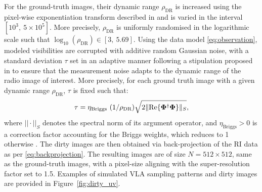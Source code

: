 \documentclass[preprint2,twocolumn]{aastex631}
\newcommand{\Phib}{\ensuremath{\boldsymbol{\Phi}}}
\begin{document}
For the ground-truth images, their dynamic range $\rho_{\textrm{DR}}$ is increased using the pixel-wise exponentiation transform described in \citet{terris2022} and is varied in the interval $[10^3,~ 5\times 10^5]$. More precisely, $\rho_{\textrm{DR}}$ is uniformly randomised in the logarithmic scale such that $\log_{10}(\rho_{\textrm{DR}})\in [3,~5.69]$. Using the data model \eqref{eq:observation}, modeled visibilities are corrupted with additive random Gaussian noise, with a standard deviation $\tau$ set in an adaptive manner following a stipulation proposed in \citet{terris2022} to ensure that the measurement noise adapts to the dynamic range of the radio image of interest. More precisely, for each ground truth image with a given dynamic range $\rho_{\textrm{DR}}$, $\tau$ is fixed such that:
\begin{equation}
{\tau = \eta_{\textrm{Briggs}}~(1/\rho_{\textrm{DR}}) \sqrt{2\|\textnormal{Re}\{{\Phib}^{\dagger}{\Phib}\}\|_S}},
\end{equation}
where $||\cdot||_S$ denotes the spectral norm of its argument operator, and $\eta_{\textrm{Briggs}}>0$ is a correction factor accounting for the Briggs weights, which reduces to 1 otherwise \citep{wilber23a}. The dirty images are then obtained via back-projection of the RI data as per \eqref{eq:backprojection}. The resulting images are of size $N=512\times 512$, same as the ground-truth images, with a pixel-size aligning with the super-resolution factor set to 1.5. Examples of simulated VLA sampling patterns and dirty images are provided in Figure~\ref{fig:dirty_uv}. 
\end{document}
